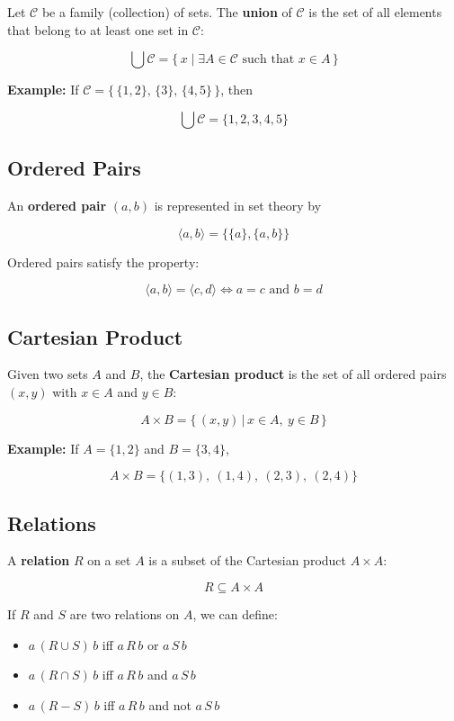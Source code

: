 \documentclass[11pt]{article}
\begin{document}
    Let $\mathcal{C}$ be a family (collection) of sets.
    The \textbf{union} of $\mathcal{C}$ is the set of all elements that belong to at least one set in $\mathcal{C}$:

    \[
    \bigcup \mathcal{C} = \{\, x \mid \exists A \in \mathcal{C} \text{ such that } x \in A\,\}
    \]

    \textbf{Example:}
    If $\mathcal{C} = \{\,\{1,2\},\,\{3\},\,\{4,5\}\,\}$, then

    \[
    \bigcup \mathcal{C} = \{1, 2, 3, 4, 5\}
    \]


    \subsection{Ordered Pairs}
    \label{subsec:ordered-pairs}

    An \textbf{ordered pair} $(a, b)$ is represented in set theory by

    \[
    \langle a, b \rangle = \{\{a\}, \{a, b\}\}
    \]

    Ordered pairs satisfy the property:

    \[
    \langle a, b \rangle = \langle c, d \rangle \iff a = c \text{ and } b = d
    \]


    \subsection{Cartesian Product}
    \label{subsec:cartesian-product}

    Given two sets $A$ and $B$, the \textbf{Cartesian product} is the set of all ordered pairs $(x, y)$ with $x \in A$ and $y \in B$:

    \[
    A \times B = \{\,(x, y)\,|\, x \in A,\ y \in B\,\}
    \]

    \textbf{Example:}
    If $A = \{1, 2\}$ and $B = \{3, 4\}$,

    \[
    A \times B = \{ (1,3),\ (1,4),\ (2,3),\ (2,4)\}
    \]


    \subsection{Relations}
    \label{subsec:relations}

    A \textbf{relation} $R$ on a set $A$ is a subset of the Cartesian product $A \times A$:

    \[
    R \subseteq A \times A
    \]

    If $R$ and $S$ are two relations on $A$, we can define:
    \begin{itemize}
        \item $a\,(R \cup S)\,b$ iff $a\,R\,b$ or $a\,S\,b$
        \item $a\,(R \cap S)\,b$ iff $a\,R\,b$ and $a\,S\,b$
        \item $a\,(R - S)\,b$ iff $a\,R\,b$ and not $a\,S\,b$
    \end{itemize}
\end{document}
